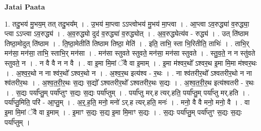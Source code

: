 \documentclass[17pt]{extarticle}
\begin{document}
\textbf{Jatai Paata} \newline

1. तदु॒भय॑ मु॒भय॒म् तत् तदु॒भय᳚म् । . उ॒भय॑ मा॒प्त्वा ऽऽप्त्वोभय॑ मु॒भय॑ मा॒प्त्वा । . आ॒प्त्वा ऽव॒रुद्ध्या॑ व॒रुद्ध्या॒ प्त्वा ऽऽप्त्वा ऽव॒रुद्ध्य॑ । . अ॒व॒रुद्ध्यो दुद॑ व॒रुद्ध्या॑ व॒रुद्ध्योत् । . अ॒व॒रुद्ध्येत्य॑व - रुद्ध्य॑ । . उत् ति॑ष्ठाम तिष्ठा॒मोदुत् ति॑ष्ठाम । . ति॒ष्ठा॒मेतीति॑ तिष्ठाम तिष्ठा॒ मेति॑ । . इति॒ ताभि॒ स्ता भि॒रितीति॒ ताभिः॑ । . ताभि॒र् मन॑सा॒ मन॑सा॒ ताभि॒ स्ताभि॒र् मन॑सा । . मन॑सा स्तुवते स्तुवते॒ मन॑सा॒ मन॑सा स्तुवते । . स्तु॒व॒ते॒ न न स्तु॑वते स्तुवते॒ न । . न वै वै न न वै । . वा इ॒मा मि॒मां ॅवै वा इ॒माम् । . इ॒मा म॑श्वर॒थो᳚ ऽश्वर॒थ इ॒मा मि॒मा म॑श्वर॒थः । . अ॒श्व॒र॒थो न ना श्व॑र॒थो᳚ ऽश्वर॒थो न । . अ॒श्व॒र॒थ इत्य॑श्व - र॒थः । . ना श्व॑तरीर॒थो᳚ ऽश्वतरीर॒थो न ना श्व॑तरीर॒थः । . अ॒श्व॒त॒री॒र॒थः स॒द्यः स॒द्यो᳚ ऽश्वतरीर॒थो᳚ ऽश्वतरीर॒थः स॒द्यः । . अ॒श्व॒त॒री॒र॒थ इत्य॑श्वतरी - र॒थः । . स॒द्यः पर्या᳚प्तु॒म् पर्या᳚प्तुꣳ स॒द्यः स॒द्यः पर्या᳚प्तुम् । . पर्या᳚प्तु मर्.ह त्यर्.हति॒ पर्या᳚प्तु॒म् पर्या᳚प्तु मर्.हति । . पर्या᳚प्तु॒मिति॒ परि॑ - आ॒प्तु॒म् । . अ॒र्॒.ह॒ति॒ मनो॒ मनो॑ ऽर्.ह त्यर्.हति॒ मनः॑ । . मनो॒ वै वै मनो॒ मनो॒ वै । . वा इ॒मा मि॒मां ॅवै वा इ॒माम् । . इ॒माꣳ स॒द्यः स॒द्य इ॒मा मि॒माꣳ स॒द्यः । . स॒द्यः पर्या᳚प्तु॒म् पर्या᳚प्तुꣳ स॒द्यः स॒द्यः पर्या᳚प्तुम् । \newline
\end{document}
